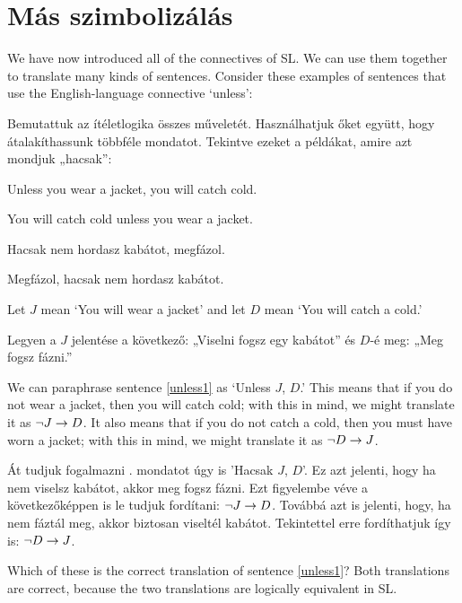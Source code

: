 \section{Más szimbolizálás}
We have now introduced all of the connectives of SL. We can use them together to translate many kinds of sentences. Consider these examples of sentences that use the English-language connective `unless':

Bemutattuk az ítéletlogika összes műveletét. Használhatjuk őket együtt, hogy átalakíthassunk többféle mondatot. Tekintve ezeket a példákat, amire azt mondjuk „hacsak”:

\begin{earg}
\item[\ex{unless1}] Unless you wear a jacket, you will catch cold.
\item[\ex{unless2}] You will catch cold unless you wear a jacket.
\end{earg}

\begin{earg}
\item[\ex{unless1}] Hacsak nem hordasz kabátot, megfázol.
\item[\ex{unless2}] Megfázol, hacsak nem hordasz kabátot.
\end{earg}



Let $J$ mean `You will wear a jacket' and let $D$ mean `You will catch a cold.'

Legyen a $J$ jelentése a következő: „Viselni fogsz egy kabátot” és $D$-é meg: „Meg fogsz fázni.”

We can paraphrase sentence \ref{unless1} as `Unless $J$, $D$.' This means that if you do not wear a jacket, then you will catch cold; with this in mind, we might translate it as $\neg J \rightarrow D$. It also means that if you do not catch a cold, then you must have worn a jacket; with this in mind, we might translate it as $\neg D \rightarrow J$.

Át tudjuk fogalmazni . mondatot úgy is 'Hacsak $J$, $D$'. Ez azt jelenti, hogy ha nem viselsz kabátot, akkor meg fogsz fázni. Ezt figyelembe véve a következőképpen is le tudjuk fordítani: $\neg J \rightarrow D$. Továbbá azt is jelenti, hogy, ha nem fáztál meg, akkor biztosan viseltél kabátot. Tekintettel erre fordíthatjuk így is: $\neg D \rightarrow J$.

Which of these is the correct translation of sentence \ref{unless1}? Both translations are correct, because the two translations are logically equivalent in SL.

